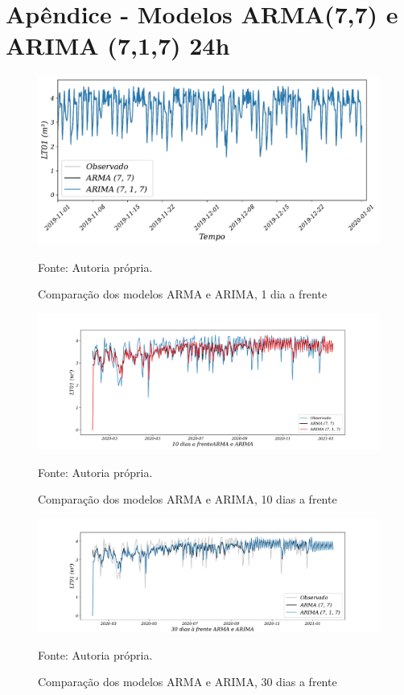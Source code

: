 
\section{Ap\^endice - Modelos ARMA(7,7) e ARIMA (7,1,7) 24h}\label{sec:armaarima24}

\begin{figure}[H]
	\centering
	\caption{Comparação dos modelos ARMA e ARIMA, 1 dia a frente }
	\label{fig:1-ARMA-ARIMA24}
	\includegraphics[width=1\linewidth]{Apendices/Figuras/modelagem-24h/1-ARMA-ARIMA}
	
	Fonte: Autoria própria.
\end{figure}

\begin{figure}[H]
	\centering
	\caption{Comparação dos modelos ARMA e ARIMA, 10 dias a frente }
	\label{fig:10-ARMA-ARIMA24}
	\includegraphics[width=1\linewidth]{Apendices/Figuras/modelagem-24h/10-ARMA-ARIMA}
	
	Fonte: Autoria própria.
\end{figure}


\begin{figure}[H]
	\centering
	\caption{Comparação dos modelos ARMA e ARIMA, 30 dias a frente }
	\label{fig:30-ARMA-ARIMA24}
	\includegraphics[width=1\linewidth]{Apendices/Figuras/modelagem-24h/30-ARMA-ARIMA}
	
	Fonte: Autoria própria.
\end{figure}

